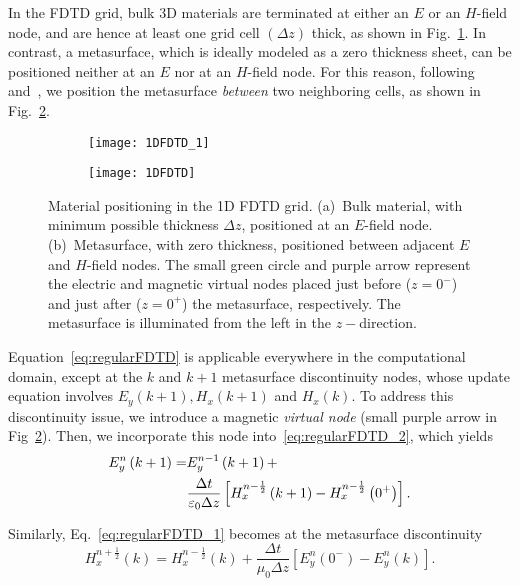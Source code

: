 \documentclass[journal]{IEEEtran}
\begin{document}
In the FDTD grid, bulk 3D materials are terminated at either an $E$ or an $H$-field node, and are hence at least one grid cell $\left(\Delta z\right)$ thick, as shown in Fig.~\ref{fig:1DFDTD_1}. In contrast, a metasurface, which is ideally modeled as a zero thickness sheet, can be positioned neither at an $E$ nor at an $H$-field node. For this reason, following~\cite{FDTDGraphene} and~\cite{GSTC-FDTD_2018_Yousef}, we position the metasurface \emph{between} two neighboring cells, as shown in Fig.~\ref{fig:1DFDTD_2}.
\begin{figure}[!ht]
\centering
\begin{subfigure}{1\columnwidth}
  \centering
  \texttt{[image: 1DFDTD\_1]}
\caption{}\label{fig:1DFDTD_1}
\end{subfigure}

\begin{subfigure}{1\columnwidth}
  \centering
\texttt{[image: 1DFDTD]}
 \caption{}\label{fig:1DFDTD_2}
\end{subfigure}
\caption{Material positioning in the 1D FDTD grid. (a)~Bulk material, with minimum possible thickness $\Delta z$, positioned at an $E$-field node. (b)~Metasurface, with zero thickness, positioned between adjacent $E$ and $H$-field nodes. The small green circle and purple arrow represent the electric and magnetic virtual nodes placed just before ($z=0^-$) and just after ($z=0^+$) the metasurface, respectively. The metasurface is illuminated from the left in the $z-$direction.}
\label{fig:1DFDTD}
\end{figure}

Equation~\eqref{eq:regularFDTD} is applicable everywhere in the computational domain, except at the $k$ and $k+1$ metasurface discontinuity nodes, whose update equation involves $E_y(k+1), H_x(k+1)$ and $H_x(k)$. To address this discontinuity issue, we introduce a magnetic \emph{virtual node} (small purple arrow in Fig~\ref{fig:1DFDTD_2}). Then, we incorporate this node into~\eqref{eq:regularFDTD_2}, which yields
\begin{align}\label{eq:updateEy}
  E_y^n \left( k+1\right)=&E_y^{n-1}\left( k+1\right)+\\\notag&\frac{\Delta t}{\varepsilon_0\Delta z}\left[H_x^{n-\frac{1}{2}}\left(k+1 \right) -H_x^{n-\frac{1}{2}}\left(0^+\right)\right].
\end{align}

Similarly, Eq.~\eqref{eq:regularFDTD_1} becomes at the metasurface discontinuity
\begin{equation}\label{eq:updateHx}
  H_x^{n+\frac{1}{2}}\left(k\right)=H_x^{n-\frac{1}{2}}\left(k\right)+\frac{\Delta t}{\mu_0\Delta z}\left[E_y^n\left(0^-\right)-E_y^n\left(k\right)\right].
\end{equation}
\end{document}
